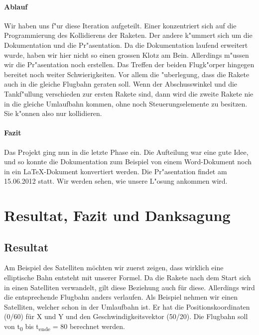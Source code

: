 \documentclass[11pt]{report}
\begin{document}
\subsubsection{Ablauf}
Wir haben uns f"ur diese Iteration aufgeteilt. Einer konzentriert sich auf die Programmierung des Kollidierens der Raketen. Der andere k"ummert sich um die Dokumentation und die Pr"asentation.
Da die Dokumentation laufend erweitert wurde, haben wir hier nicht so einen grossen Klotz am Bein. Allerdings m"ussen wir die Pr"asentation noch erstellen.
Das Treffen der beiden Flugk"orper hingegen bereitet noch weiter Schwierigkeiten. Vor allem die "uberlegung, dass die Rakete auch in die gleiche Flugbahn geraten soll. Wenn der Abschusswinkel und die Tankf"ullung verschieden zur ersten Rakete sind, dann wird die zweite Rakete nie in die gleiche Umlaufbahn kommen, ohne noch Steuerungselemente zu besitzen. Sie k"onnen also nur kollidieren.

\subsubsection{Fazit}
Das Projekt ging nun in die letzte Phase ein. Die Aufteilung war eine gute Idee, und so konnte die Dokumentation zum Beispiel von einem Word-Dokument noch in ein LaTeX-Dokument konvertiert werden. Die Pr"asentation findet am 15.06.2012 statt. Wir werden sehen, wie unsere L"osung ankommen wird.
\newpage
\chapter{Resultat, Fazit und Danksagung}
\section{Resultat}
Am Beispiel des Satelliten möchten wir zuerst zeigen, dass wirklich eine elliptische Bahn entsteht mit unserer Formel. Da die Rakete nach dem Start sich in einen Satelliten verwandelt, gilt diese Beziehung auch für diese. Allerdings wird die entsprechende Flugbahn anders verlaufen. Als Beispiel nehmen wir einen Satelliten, welcher schon in der Umlaufbahn ist. Er hat die Positionskoordinaten (0/60) für X und Y und den Geschwindigkeitsvektor (50/20). Die Flugbahn soll von t\textsubscript{0} bis t\textsubscript{ende} = 80 berechnet werden.
\linebreak
\end{document}
